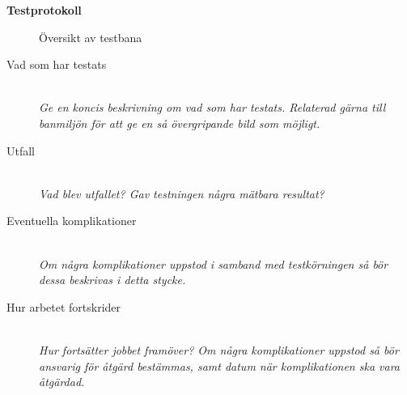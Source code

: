 \documentclass[11pt]{article}
\begin{document}
\begin{center}

{\Huge\bfseries Testprotokoll}
\vspace{4em}
\end{center}

\begin{flushleft}


\begin{figure}[htbp]
\centering
\noindent\resizebox{.4\linewidth}{!}{
	}
	\caption{Översikt av testbana\label{bana}}	
\end{figure}

\begin{description}
\item[Vad som har testats] \hfill \\
\textit{Ge en koncis beskrivning om vad som har testats. Relaterad gärna till banmiljön för att ge en så övergripande bild som möjligt.}
\vspace{1em}
\item[Utfall] \hfill \\
\textit{Vad blev utfallet? Gav testningen några mätbara resultat?}
\vspace{1em}
\item[Eventuella komplikationer] \hfill \\
\textit{Om några komplikationer uppstod i samband med testkörningen så bör dessa beskrivas i detta stycke.}
\vspace{1em}
\item[Hur arbetet fortskrider] \hfill \\
\textit{Hur fortsätter jobbet framöver? Om några komplikationer uppstod så bör ansvarig för åtgärd bestämmas, samt datum när komplikationen ska vara åtgärdad.}
\end{description}

\end{flushleft}
\end{document}
